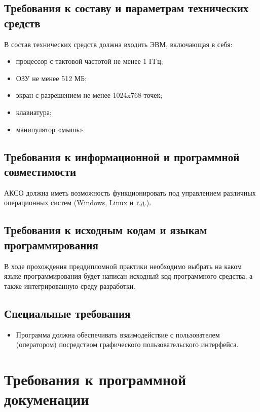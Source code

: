 \documentclass[a4paper,14pt]{extreport}
\begin{document}
	\subsection{Требования к составу и параметрам технических средств}
	В состав технических средств должна входить ЭВМ, включающая в себя:
	
	\begin{itemize}
		\item процессор с тактовой частотой не менее  1 ГГц;
		\item ОЗУ не менее 512 МБ;
		\item экран с разрешением не менее 1024x768 точек;
		\item клавиатура;
		\item манипулятор «мышь».
	\end{itemize}	
	
	\subsection{Требования к информационной и программной совместимости}
	
	АКСО должна иметь возможность функционировать под управлением различных операционных систем (Windows, Linux и т.д.).
	
	\subsection{Требования к исходным кодам и языкам программирования}
	
	В ходе прохождения преддипломной практики необходимо выбрать на каком языке программирования будет написан исходный код программного средства, а также интегрированную среду разработки.
	
	\subsection{Специальные требования}
	
\begin{itemize}
	\item 	Программа должна обеспечивать взаимодействие с пользователем (оператором) посредством графического пользовательского интерфейса.
\end{itemize}
	
	\section{Требования к программной докуменации}
\end{document}
